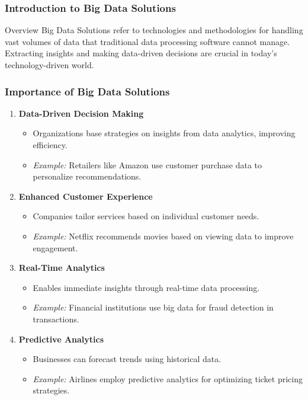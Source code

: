 \documentclass[aspectratio=169]{beamer}
\begin{document}
\frame{\titlepage}

\begin{frame}[fragile]
    \frametitle{Introduction to Big Data Solutions}
    \begin{block}{Overview}
        Big Data Solutions refer to technologies and methodologies for handling vast volumes of data that traditional data processing software cannot manage. 
        Extracting insights and making data-driven decisions are crucial in today's technology-driven world.
    \end{block}
\end{frame}

\begin{frame}[fragile]
    \frametitle{Importance of Big Data Solutions}
    \begin{enumerate}
        \item \textbf{Data-Driven Decision Making}
            \begin{itemize}
                \item Organizations base strategies on insights from data analytics, improving efficiency.
                \item \textit{Example:} Retailers like Amazon use customer purchase data to personalize recommendations.
            \end{itemize}
        
        \item \textbf{Enhanced Customer Experience}
            \begin{itemize}
                \item Companies tailor services based on individual customer needs.
                \item \textit{Example:} Netflix recommends movies based on viewing data to improve engagement.
            \end{itemize}
        
        \item \textbf{Real-Time Analytics}
            \begin{itemize}
                \item Enables immediate insights through real-time data processing.
                \item \textit{Example:} Financial institutions use big data for fraud detection in transactions.
            \end{itemize}
        
        \item \textbf{Predictive Analytics}
            \begin{itemize}
                \item Businesses can forecast trends using historical data.
                \item \textit{Example:} Airlines employ predictive analytics for optimizing ticket pricing strategies.
            \end{itemize}
    \end{enumerate}
\end{frame}
\end{document}
